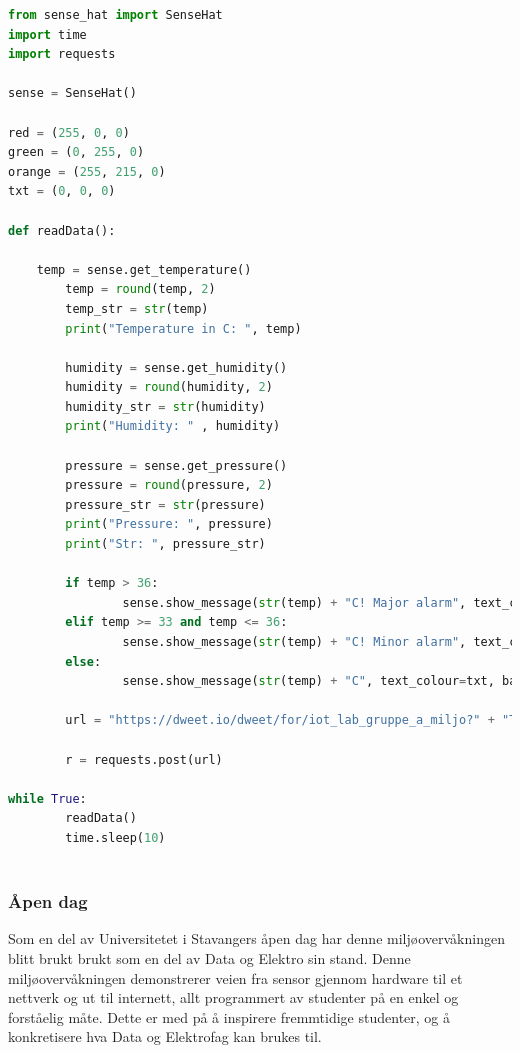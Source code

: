 \documentclass{article}
\begin{document}
\begin{lstlisting}[language=Python, caption=Python Dweet.io publisering]
from sense_hat import SenseHat
import time
import requests

sense = SenseHat()

red = (255, 0, 0)
green = (0, 255, 0)
orange = (255, 215, 0)
txt = (0, 0, 0)

def readData():

	temp = sense.get_temperature()
        temp = round(temp, 2)
        temp_str = str(temp)
        print("Temperature in C: ", temp)

        humidity = sense.get_humidity()
        humidity = round(humidity, 2)
        humidity_str = str(humidity)
        print("Humidity: " , humidity)

        pressure = sense.get_pressure()
        pressure = round(pressure, 2)
        pressure_str = str(pressure)
        print("Pressure: ", pressure)
        print("Str: ", pressure_str)

        if temp > 36:
                sense.show_message(str(temp) + "C! Major alarm", text_colour=txt, back_colour=red)
        elif temp >= 33 and temp <= 36:
                sense.show_message(str(temp) + "C! Minor alarm", text_colour=txt, back_colour=orange)
        else:
                sense.show_message(str(temp) + "C", text_colour=txt, back_colour=green)

        url = "https://dweet.io/dweet/for/iot_lab_gruppe_a_miljo?" + "Temperatur=" + temp_str + "&Humidity=" + humidity_str + "&Pressure=" + pressure_str

        r = requests.post(url)

while True:
        readData()
        time.sleep(10)
        
 \end{lstlisting}


\subsubsection{Åpen dag}
Som en del av Universitetet i Stavangers åpen dag har denne miljøovervåkningen blitt brukt brukt som en del av Data og Elektro sin stand. Denne miljøovervåkningen demonstrerer veien fra sensor gjennom hardware til et nettverk og ut til internett, allt programmert av studenter på en enkel og forståelig måte. Dette er med på å inspirere fremmtidige studenter, og å konkretisere hva Data og Elektrofag kan brukes til.
\end{document}
